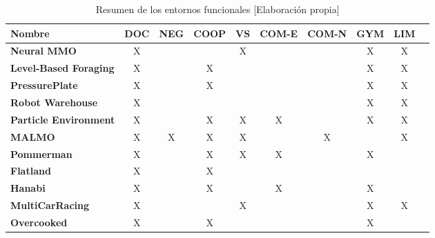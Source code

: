 \begin{table}[h]
	\begin{center}
		\begin{tabular}{| l | c | c | c | c | c | c | c | c | c |}
			\hline
			\textbf{Nombre}               & \textbf{DOC} & \textbf{NEG} & \textbf{COOP} & \textbf{VS} & \textbf{COM-E} & \textbf{COM-N} & \textbf{GYM} & \textbf{LIM} \\ \hline
			\textbf{Neural MMO}           & X            &              &               & X           &                &                & X            & X            \\
			\textbf{Level-Based Foraging} & X            &              & X             &             &                &                & X            & X            \\
			\textbf{PressurePlate}        & X            &              & X             &             &                &                & X            & X            \\
			\textbf{Robot Warehouse}      & X            &              &               &             &                &                & X            & X            \\
			\textbf{Particle Environment} & X            &              & X             & X           & X              &                & X            & X            \\
			\textbf{MALMO}                & X            & X            & X             & X           &               &  X             &             & X            \\
			\textbf{Pommerman}            & X            &              & X             & X           & X              &                & X            &              \\
			\textbf{Flatland}             & X            &              & X             &             &                &                &              &              \\
			\textbf{Hanabi}               & X            &              & X             &             & X              &                & X            &              \\
			\textbf{MultiCarRacing}       & X            &              &               & X           &                &                & X            & X            \\
			\textbf{Overcooked}           & X            &              & X             &             &                &                & X            &              \\ \hline
		\end{tabular}
		\caption{Resumen de los entornos funcionales [Elaboración propia]}
		\label{tab:funcionales}
	\end{center}
\end{table}

